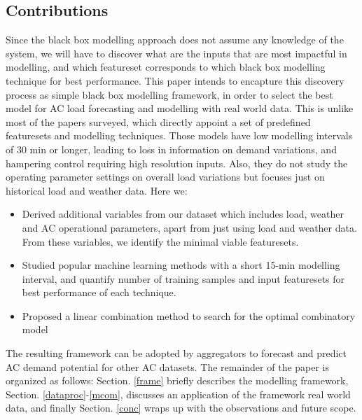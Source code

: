\documentclass[conference]{IEEEtran}
\begin{document}
 \subsection{Contributions}
  Since the black box modelling approach does not assume any knowledge of the system, we will have to discover what are the inputs that are most impactful in modelling, and which featureset corresponds to which black box modelling technique for best performance. This paper intends to encapture this discovery process as simple black box modelling framework, in order to select the best model for AC load forecasting and modelling with real world data. This is unlike most of the papers surveyed, which directly appoint a set of predefined featuresets and modelling techniques. Those models have low modelling intervals of 30 min or longer, leading to loss in information on demand variations, and hampering control requiring high resolution inputs. Also, they do not study the operating parameter settings on overall load variations but focuses just on historical load and weather data.
  Here we:     
\begin{itemize}
	\item Derived additional variables from our dataset which includes load, weather and AC operational parameters, apart from just using load and weather data. From these variables, we identify the minimal viable featuresets.
	\item Studied popular machine learning methods with a short 15-min modelling interval, and quantify number of training samples and input featuresets for best performance of each technique. 
	\item Proposed a linear combination method to search for the optimal combinatory model
\end{itemize}
The resulting framework can be adopted by aggregators to forecast and predict AC demand potential for other AC datasets. The remainder of the paper is organized as follows: Section. \ref{frame} briefly describes the modelling framework, Section. \ref{dataproc}-\ref{mcom}, discusses an application of the framework real world data, and finally Section. \ref{conc} wraps up with the observations and future scope.
\end{document}
